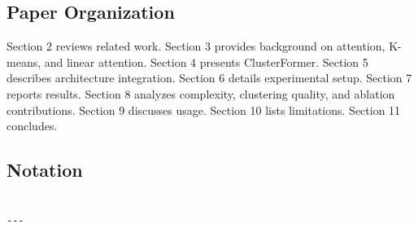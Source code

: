 \subsection{Paper Organization}

Section 2 reviews related work. Section 3 provides background on attention, 
K-means, and linear attention. Section 4 presents ClusterFormer. Section 5 
describes architecture integration. Section 6 details experimental setup. 
Section 7 reports results. Section 8 analyzes complexity, clustering quality, 
and ablation contributions. Section 9 discusses usage. Section 10 lists 
limitations. Section 11 concludes.



\subsection{Notation}

\begin{lstlisting}

---
\end{lstlisting}